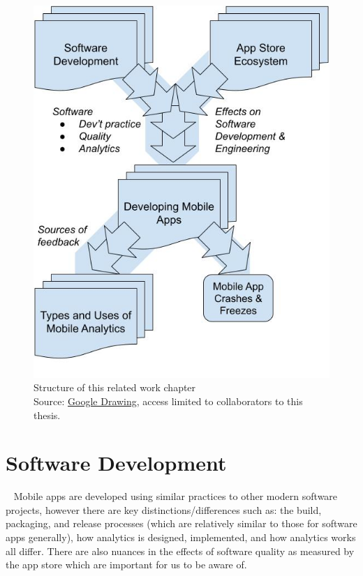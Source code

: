 \begin{figure}
    \centering
    \includegraphics[width=\textwidth]{images/my/related-work-chapter-structure-27-jul-2022b.jpeg}
    \caption[Structure of this related work chapter]{Structure of this related work chapter\\ Source: \href{https://docs.google.com/drawings/d/1DosM__BfTGqoIYkkkltbyDreCT5wYC1Z0mR9i1ZSxWc/edit?usp=sharing}{Google Drawing}, access limited to collaborators to this thesis.}
    \label{fig:related-work-chapter-structure}
\end{figure}



\section{Software Development}~\label{rw-software-development-section}
Mobile apps are developed using similar practices to other modern software projects, however there are key distinctions/differences such as: the build, packaging, and release processes (which are relatively similar to those for software apps generally), how analytics is designed, implemented, and how analytics works all differ. There are also nuances in the effects of software quality as measured by the app store which are important for us to be aware of.

